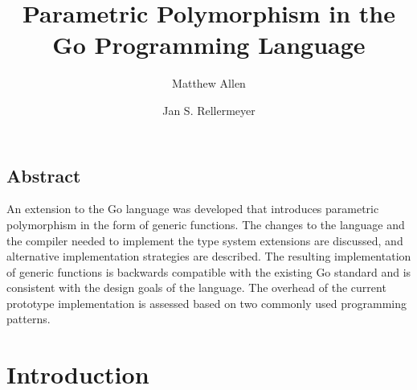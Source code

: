 \documentclass[letterpaper,twocolumn,11pt]{article}
\begin{document}
\date{}

\title{\Large \bf Parametric Polymorphism in the Go Programming Language}

\author[1]{Matthew Allen}
\author[1,2]{Jan S. Rellermeyer}
\renewcommand\Authands{ and }


\maketitle

\thispagestyle{empty}


\subsection*{Abstract}
An extension to the Go language was developed that introduces parametric polymorphism in the form of generic functions. The changes to the language and the compiler needed to implement the type system extensions are discussed, and alternative implementation strategies are described. The resulting implementation of generic functions is backwards compatible with the existing Go standard and is consistent with the design goals of the language. The overhead of the current prototype implementation is assessed based on two commonly used programming patterns. 

\section{Introduction} \label{introduction}
\end{document}
